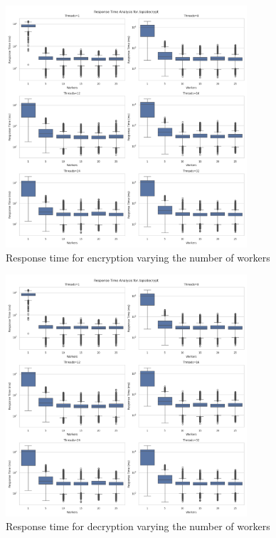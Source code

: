 \documentclass[cic,tc,english]{iiufrgs}
\begin{document}
            \begin{figure}
                \centering
                \includegraphics[width=0.8\textwidth]{images/phase1/api_decrypt/response_time_threads_summary.png}
                \caption{Response time for encryption varying the number of workers}
                \label{fig:encrypt_response_time_threads}
            \end{figure}

            \begin{figure}
                \centering
                \includegraphics[width=0.8\textwidth]{images/phase1/api_decrypt/response_time_threads_summary.png}
                \caption{Response time for decryption varying the number of workers}
                \label{fig:decrypt_response_time_threads}
            \end{figure}
\end{document}
